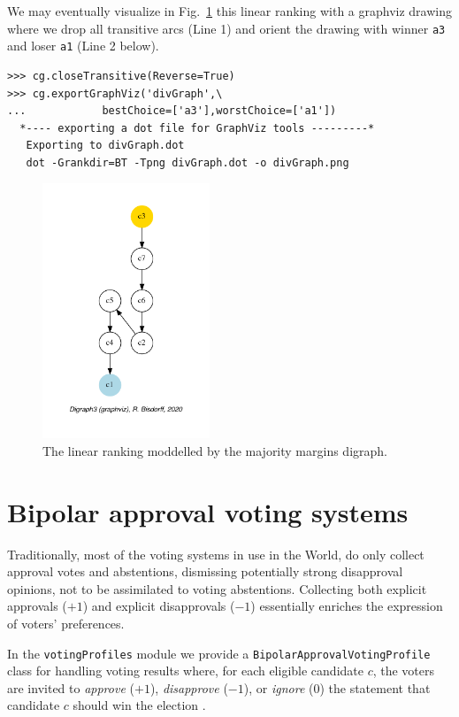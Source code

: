 We may eventually visualize in Fig.~\ref{fig:20.2} this linear ranking with a graphviz drawing where we drop all transitive arcs (Line 1) and orient the drawing with \Condorcet winner \texttt{a3} and loser \texttt{a1} (Line 2 below).
\begin{lstlisting}
>>> cg.closeTransitive(Reverse=True)
>>> cg.exportGraphViz('divGraph',\
...            bestChoice=['a3'],worstChoice=['a1'])
  *---- exporting a dot file for GraphViz tools ---------*
   Exporting to divGraph.dot
   dot -Grankdir=BT -Tpng divGraph.dot -o divGraph.png
\end{lstlisting}
\begin{figure}[h]
\sidecaption
\includegraphics[width=5cm]{Figures/20-2-divGraph.pdf}
\caption{The linear ranking moddelled by the majority margins digraph.} 
\label{fig:20.2}       %
\end{figure}


\section{Bipolar approval voting systems}
\label{sec:20.2}

Traditionally, most of the voting systems in use in the World, do only collect approval votes and abstentions, dismissing potentially strong disapproval opinions, not to be assimilated to voting abstentions. Collecting both explicit approvals ($+1$) and explicit disapprovals ($-1$) essentially enriches the expression of voters' preferences. 

In the \texttt{votingProfiles} module we provide a \texttt{BipolarApprovalVotingProfile} class for handling voting results where, for each eligible candidate $c$, the voters are invited  to \emph{approve} ($+1$), \emph{disapprove} ($-1$), or \emph{ignore} ($0$) the statement that candidate $c$ should win the election \citep{BAU-2012}.

